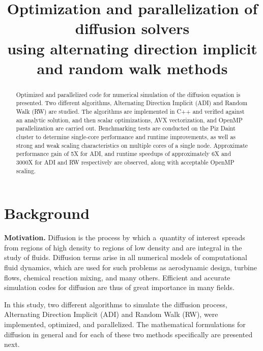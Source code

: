 \documentclass[letterpaper]{article}
\title{Optimization and parallelization of diffusion solvers\\
using alternating direction implicit and random walk methods}
\newcommand{\mypar}[1]{{\bf #1.}}
\begin{document}
%
\maketitle
%


\begin{abstract}
Optimized and parallelized code for numerical simulation of the diffusion equation is presented. Two different algorithms, Alternating Direction Implicit (ADI) and Random Walk (RW) are studied. The algorithms are implemented in C++ and verified against an analytic solution, and then scalar optimizations, AVX vectorization, and OpenMP parallelization are carried out. Benchmarking tests are conducted on the Piz Daint cluster to determine single-core performance and runtime improvements, as well as strong and weak scaling characteristics on multiple cores of a single node. Approximate performance gain of 5X for ADI, and runtime speedups of approximately 6X and 3000X for ADI and RW respectively are observed, along with acceptable OpenMP scaling.
\end{abstract}


\section{Background}\label{sec:background}

\mypar{Motivation} 
Diffusion is the process by which a~quantity of interest spreads from regions of high density to regions of low density and are integral in the study of fluids. Diffusion terms arise in all numerical models of computational fluid dynamics, which are used for such problems as aerodynamic design, turbine flows, chemical reaction mixing, and many others. Efficient and accurate simulation codes for diffusion are thus of great importance in many fields.

In this study, two different algorithms to simulate the diffusion process, Alternating Direction Implicit (ADI) and Random Walk (RW), were implemented, optimized, and parallelized. The mathematical formulations for diffusion in general and for each of these two methods specifically are presented next.
\end{document}
